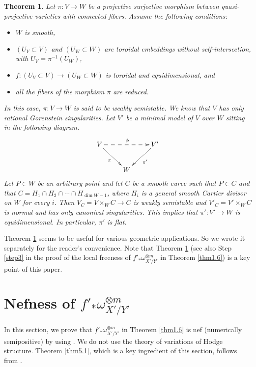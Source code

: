 \documentclass[12pt,twoside]{amsart}
\newtheorem{thm}{Theorem}[section]
\theoremstyle{definition}
\begin{document}
\begin{thm}\label{thm4.2}
Let $\pi:V\to W$ be a projective surjective morphism between 
quasi-projective varieties with connected fibers. 
Assume the following conditions: 
\begin{itemize}
\item[(i)] $W$ is smooth, 
\item[(ii)] $(U_V\subset V)$ and $(U_W\subset W)$ are 
toroidal embeddings without self-intersection, with $U_V=\pi^{-1}(U_W)$,  
\item[(iii)] $f:(U_V\subset V)\to (U_W\subset W)$ is toroidal and 
equidimensional, and 
\item[(iv)] all the fibers of the morphism $\pi$ are reduced. 
\end{itemize} 
In this case, $\pi:V\to W$ is said to be weakly semistable. 
We know that $V$ has only rational Gorenstein singularities. 
Let $V'$ be a minimal model of $V$ over $W$ 
sitting in the following diagram. 
$$
\xymatrix{
V\ar[dr]_{\pi}\ar@{-->}[rr]^\phi&& V'\ar[dl]^{\pi'}\\
&W&
}
$$
Let $P\in W$ be an arbitrary point and let $C$ be a smooth 
curve such that $P\in C$ and that $C=H_1\cap H_2\cap 
\cdots \cap H_{\dim W-1}$, 
where $H_i$ is a general smooth Cartier divisor on $W$ for every $i$. 
Then $V_C=V\times _W C\to C$ is 
weakly semistable and 
$V'_C=V'\times _W C$ is normal and has only canonical singularities. 
This implies that $\pi': V'\to W$ is equidimensional. 
In particular, $\pi'$ is flat. 
\end{thm}

Theorem \ref{thm4.2} seems to be useful for various geometric applications. 
So we wrote it separately for the reader's convenience. 
Note that Theorem \ref{thm4.2} (see also Step \ref{step3} in the 
proof of the local freeness of $f'_*\omega^{\otimes m}_{X'/Y'}$ in 
Theorem \ref{thm1.6}) is a key point of this paper. 

\section{Nefness of $f'_*\omega^{\otimes m}_{X'/Y'}$}\label{sec5}

In this section, we prove that $f'_*\omega^{\otimes m}_{X'/ Y'}$ 
in Theorem \ref{thm1.6} is nef (numerically semipositive) 
by using \cite{popa-schnell}. 
We do not use the theory of variations of Hodge structure.   
Theorem \ref{thm5.1}, which is 
a key ingredient of this section, follows from \cite[Theorem 1.4]{popa-schnell}. 
\end{document}

